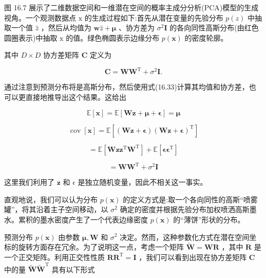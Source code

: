 \documentclass[10pt]{article}
\begin{document}
图 16.7 展示了二维数据空间和一维潜在空间的概率主成分分析(PCA)模型的生成视角。一个观测数据点 \(\mathrm{x}\) 的生成过程如下:首先从潜在变量的先验分布 \(p\left( z\right)\) 中抽取一个值 \(\widehat{z}\) ，然后从均值为 \(\mathbf{w}\widehat{z} + \mathbf{\mu }\) 、协方差为 \({\sigma }^{2}\mathbf{I}\) 的各向同性高斯分布(由红色圆圈表示)中抽取 \(\mathrm{x}\) 的值。绿色椭圆表示边缘分布 \(p\left( \mathbf{x}\right)\) 的密度轮廓。

其中 \(D \times  D\) 协方差矩阵 \(\mathbf{C}\) 定义为

\[
\mathbf{C} = \mathbf{W}{\mathbf{W}}^{\mathrm{T}} + {\sigma }^{2}\mathbf{I}. \tag{16.36}
\]

通过注意到预测分布将是高斯分布，然后使用式(16.33)计算其均值和协方差，也可以更直接地推导出这个结果。这给出

\[
\mathbb{E}\left\lbrack  \mathbf{x}\right\rbrack   = \mathbb{E}\left\lbrack  {\mathbf{W}\mathbf{z} + \mathbf{\mu } + \mathbf{\epsilon }}\right\rbrack   = \mathbf{\mu } \tag{16.37}
\]

\[
\operatorname{cov}\left\lbrack  \mathbf{x}\right\rbrack   = \mathbb{E}\left\lbrack  {\left( {\mathbf{W}\mathbf{z} + \mathbf{\epsilon }}\right) {\left( \mathbf{W}\mathbf{z} + \mathbf{\epsilon }\right) }^{\mathrm{T}}}\right\rbrack
\]

\[
= \mathbb{E}\left\lbrack  {\mathbf{W}\mathbf{z}{\mathbf{z}}^{\mathrm{T}}{\mathbf{W}}^{\mathrm{T}}}\right\rbrack   + \mathbb{E}\left\lbrack  {\mathbf{\epsilon }{\mathbf{\epsilon }}^{\mathrm{T}}}\right\rbrack   \tag{16.38}
\]

\[
= \mathbf{W}{\mathbf{W}}^{\mathrm{T}} + {\sigma }^{2}\mathbf{I} \tag{16.39}
\]

这里我们利用了 \(\mathbf{z}\) 和 \(\epsilon\) 是独立随机变量，因此不相关这一事实。

直观地说，我们可以认为分布 \(p\left( \mathbf{x}\right)\) 的定义方式是:取一个各向同性的高斯“喷雾罐”，将其沿着主子空间移动，以 \({\sigma }^{2}\) 确定的密度并根据先验分布加权喷洒高斯墨水。累积的墨水密度产生了一个代表边缘密度 \(p\left( \mathbf{x}\right)\) 的“薄饼”形状的分布。

预测分布 \(p\left( \mathbf{x}\right)\) 由参数 \(\mathbf{\mu },\mathbf{W}\) 和 \({\sigma }^{2}\) 决定。然而，这种参数化方式在潜在空间坐标的旋转方面存在冗余。为了说明这一点，考虑一个矩阵 \(\widetilde{\mathbf{W}} = \mathbf{{WR}}\) ，其中 \(\mathbf{R}\) 是一个正交矩阵。利用正交性性质 \(\mathbf{R}{\mathbf{R}}^{\mathrm{T}} = \mathbf{I}\) ，我们可以看到出现在协方差矩阵 \(\mathbf{C}\) 中的量 \(\widetilde{\mathbf{W}}{\widetilde{\mathbf{W}}}^{\mathrm{T}}\) 具有以下形式
\end{document}
